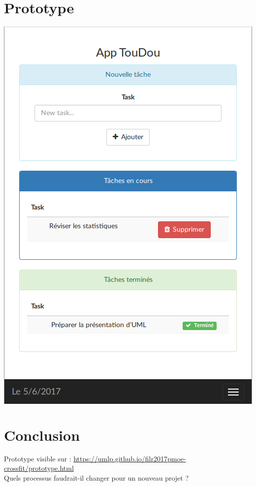 \documentclass[french]{beamer}
\begin{document}
\section{Prototype}
\begin{frame}
  \begin{center}
  \begin{minipage}[c]{0.4\linewidth}%
   \includegraphics[width=1\linewidth]{prototype}  %
  \end{minipage}
\end{center}
\end{frame}

\section{Conclusion}
\begin{frame}
\begin{center}
  Prototype visible sur : \url{https://umlp.github.io/filr2017pmoe-crossfit/prototype.html}\\
  \vspace{0.5cm}
  Quels processus faudrait-il changer pour un nouveau projet ?
\end{center}
\end{frame}
\end{document}
